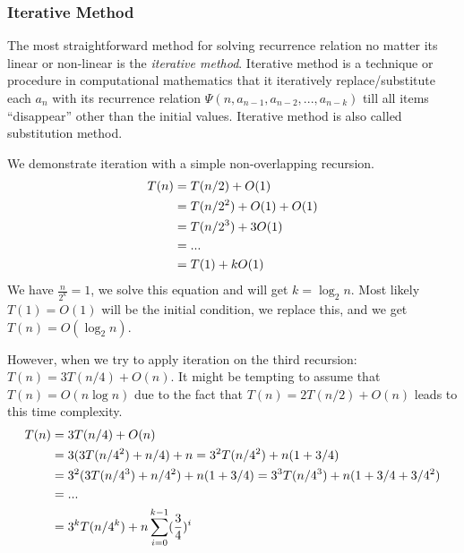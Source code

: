 \documentclass[../main.tex]{subfiles}
\begin{document}
 \subsubsection{Iterative Method}
The most straightforward method for solving recurrence relation no matter its linear or non-linear is the \textit{iterative method}. Iterative method is a technique or procedure in computational mathematics that it iteratively replace/substitute each $a_n$ with its recurrence relation $\Psi(n, a_{n-1}, a_{n-2}, ..., a_{n-k})$ till all items ``disappear'' other than the initial values. Iterative method is also called substitution method. 

We demonstrate iteration with a simple non-overlapping recursion. 
\begin{align}
\label{complexity_eq_binary_search}
    T(n)&=T(n/2)+O(1)\\
    &=T(n/2^2)+O(1)+O(1)\notag\\
    &=T(n/2^3)+3O(1)\notag\\
    &=...\notag\\
    &=T(1)+kO(1)
\end{align}
We have $\frac{n}{2^k}=1$, we solve this equation and will get $k=\log_2 n$. Most likely $T(1)=O(1)$ will be the initial condition, we replace this, and we get $T(n)=O(\log_2 n)$.

However, when we try to apply iteration on the third recursion:  $T(n)=3T(n/4)+O(n)$. It might be tempting to assume that $T(n)=O(n\log n)$ due to the fact that $T(n)=2T(n/2)+O(n)$ leads to this time complexity.
\begin{align}
\label{complexity_non_overlap_1}
    T(n)&=3T(n/4)+O(n)\\
    &=3(3T(n/4^2)+n/4)+n=3^2T(n/4^2)+n(1+3/4)\notag\\
    &=3^2(3T(n/4^3)+n/4^2)+n(1+3/4)=3^3T(n/4^3)+n(1+3/4+3/4^2)\\
    &=...\\
    &=3^kT(n/4^k)+n\sum_{i=0}^{k-1}(\frac{3}{4})^{i}
\end{align}
\end{document}
